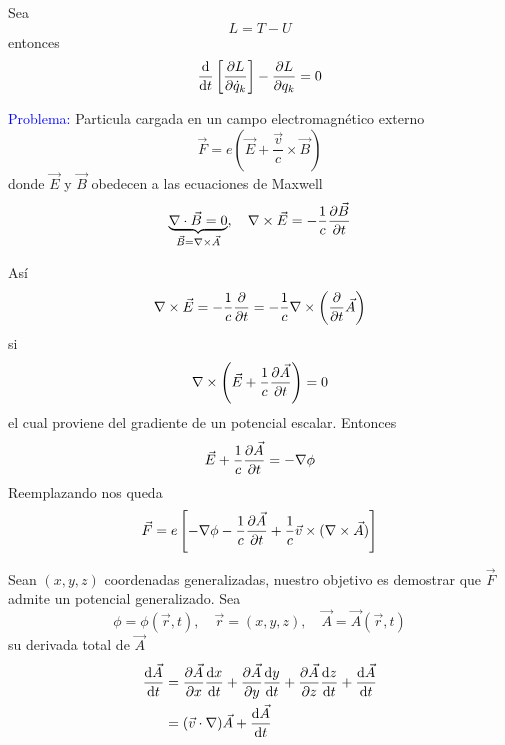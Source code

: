 \documentclass[../main]{subfiles}
\begin{document}
Sea
\begin{equation}
    L=T-U
\end{equation}
entonces 
\begin{equation}
    \dv{}{t}\left[\pdv{L}{\dot{q}_k}\right]-\pdv{L}{q_k}=0
\end{equation}

\textcolor{blue}{Problema:} Particula cargada en un campo electromagnético externo
\begin{equation*}
    \vec{F}=e\left(\vec{E}+\dfrac{\vec{v}}{c}\times \vec{B}\right)
\end{equation*}
donde $\vec{E}$ y $\vec{B}$ obedecen a las ecuaciones de Maxwell
\begin{equation*}
    \underbrace{\nabla \cdot \vec{B}=0}_{\vec{B}=\nabla \times \vec{A}}, \quad \nabla \times \vec{E}=-\dfrac{1}{c}\pdv{\vec{B}}{t}
\end{equation*}

Así
\begin{align*}
    \nabla \times \vec{E}=-\dfrac{1}{c}\pdv{}{t}(\nabla \times \vec{A})=-\dfrac{1}{c}\nabla \times \left(\pdv{}{t}\vec{A}\right)
\end{align*}
si
\begin{equation*}
    \nabla \times \left(\vec{E}+\dfrac{1}{c}\pdv{\vec{A}}{t}\right)=0
\end{equation*}
el cual proviene del gradiente de un potencial escalar. Entonces
\begin{equation*}
    \vec{E}+\dfrac{1}{c}\pdv{\vec{A}}{t}=-\nabla \phi
\end{equation*}
Reemplazando nos queda
\begin{equation*}
    \vec{F}=e\left[-\nabla \phi-\dfrac{1}{c}\pdv{\vec{A}}{t}+\dfrac{1}{c}\vec{v}\times(\nabla \times \vec{A})\right]
\end{equation*}

Sean $(x,y,z)$ coordenadas generalizadas, nuestro objetivo es demostrar que $\vec{F}$ admite un potencial generalizado. Sea
\begin{equation*}
    \phi=\phi(\vec{r}, t), \quad \vec{r}=(x,y,z), \quad \vec{A}=\vec{A}(\vec{r}, t)
\end{equation*}
su derivada total de $\vec{A}$
\begin{align*}
    \dv{\vec{A}}{t}&=\pdv{\vec{A}}{x}\dv{x}{t}+\pdv{\vec{A}}{y}\dv{y}{t}+\pdv{\vec{A}}{z}\dv{z}{t}+\dv{\vec{A}}{t}\\
    &=(\vec{v}\cdot \nabla)\vec{A}+\dv{\vec{A}}{t}
\end{align*}
\end{document}
